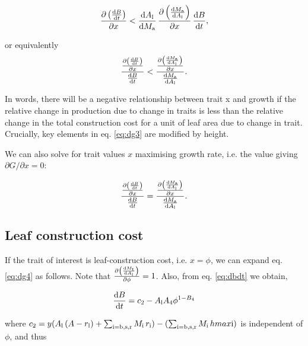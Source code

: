 \documentclass[12pt, a4paper]{article}
\begin{document}
\begin{appendices}
\begin{equation}\label{eq:dg3}
\frac{\partial \left( \frac{ {\rm d}B} {{\rm d}t}\right)}{\partial x}
< \frac{{\rm d}A_{\rm l}} {{\rm d}M_{\rm a}}
\,  \frac{\partial \left(\frac{{\rm d}M_{\rm a}} {{\rm d}A_{\rm l}}\right)
}{\partial x} \, \frac{ {\rm d}B} {{\rm d}t},
\end{equation}

or equivalently
\begin{equation}\label{eq:dg4}
\frac{
\frac{\partial \left( \frac{ {\rm d}B} {{\rm d}t}\right)}{\partial x} }
{\frac{ {\rm d}B} {{\rm d}t}}
<
\frac{ \frac{\partial \left(\frac{{\rm d}M_{\rm a}} {{\rm d}A_{\rm l}}\right)
}{\partial x}}{\frac{{\rm d}M_{\rm a}} {{\rm d}A_{\rm l}}}.
\end{equation}

In words, there will be a negative relationship between trait x and growth if the
relative change in production due to change in traits is less than the relative change
in the total construction cost for a unit of leaf area due to change in trait. Crucially,
key elements in eq. \ref{eq:dg3} are modified by height.

We can also solve for trait values $x$ maximising growth rate, i.e. the value
giving $\partial G /\partial x = 0$:

\begin{equation}\label{eq:max}
\frac{
\frac{\partial \left( \frac{ {\rm d}B} {{\rm d}t}\right)}{\partial x} }
{\frac{ {\rm d}B} {{\rm d}t}}
=
\frac{ \frac{\partial \left(\frac{{\rm d}M_{\rm a}} {{\rm d}A_{\rm l}}\right)
}{\partial x}}{\frac{{\rm d}M_{\rm a}} {{\rm d}A_{\rm l}}}.
\end{equation}

\subsection{Leaf construction cost}

If the trait of interest is leaf-construction cost, i.e. $x=\phi$, we can expand
eq. \ref{eq:dg4} as follows. Note that $\frac{\partial \left(\frac{{\rm d}M_\textrm
{t}} {{\rm d}A_{\rm l}}\right)}{\partial \phi} = 1$. Also, from eq. \ref{eq:dbdt} we obtain,

\begin{equation}\label{eq:dbdt2}
\frac{{\rm d}B}{{\rm d}t} = c_2 - A_{\rm l} A_4 \phi ^{1-B_4}
\end{equation}

where
$c_2 = y ( A_{\rm l} \, (A - r_{\rm l}) + \sum_\textrm{i=b,s,r}{M_\textrm{i} \, r_\textrm{i}}) - (\sum_\textrm{i=b,s,r}{M_\textrm{i} \, hmax\textrm{i}})$
is independent of $\phi$, and thus


\end{appendices}
\end{document}
